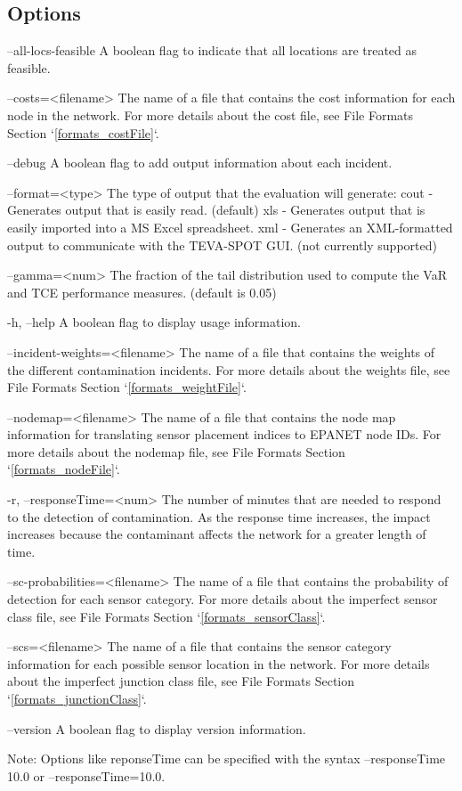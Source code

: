 \subsection{Options}\label{evalsensorExecutable_evalsensorOptions}
%
\begin{unknownListing}
     --all-locs-feasible
     A boolean flag to indicate that all locations are treated as feasible.
     
     --costs=<filename>
     The name of a file that contains the cost information for each node in the network.
	 For more details about the cost file, see File Formats Section `\ref{formats_costFile}`.
     
     --debug    
     A boolean flag to add output information about each incident.

     --format=<type>
     The type of output that the evaluation will generate:
		cout - 	Generates output that is easily read. (default)
		xls - 	Generates output that is easily imported into a MS Excel spreadsheet.
		xml - 	Generates an XML-formatted output to communicate 
				with the TEVA-SPOT GUI. (not currently supported)
		      
     --gamma=<num>
     The fraction of the tail distribution used to compute the VaR and TCE 
	 performance measures. (default is 0.05)
	 
	 -h, --help
	 A boolean flag to display usage information.
	 
	 --incident-weights=<filename>
	 The name of a file that contains the weights of the different contamination incidents. 
	 For more details about the weights file, see File Formats Section `\ref{formats_weightFile}`.
	 
	 --nodemap=<filename>
	 The name of a file that contains the node map information for translating sensor placement 
	 indices to EPANET node IDs. For more details about the nodemap file, see File Formats 
	 Section `\ref{formats_nodeFile}`.
	 
	 -r, --responseTime=<num>
	 The number of minutes that are needed to respond to the detection of 
	 contamination. As the response time increases, the impact increases 
	 because the contaminant affects the network for a greater length of 
	 time.
	 
	 --sc-probabilities=<filename>
	 The name of a file that contains the probability of detection for each sensor category. 
	 For more details about the imperfect sensor class file, see File Formats Section 
	 `\ref{formats_sensorClass}`.
	 
	 --scs=<filename>
	 The name of a file that contains the sensor category information for each possible 
	 sensor location in the network. For more details about the imperfect junction class file, 
	 see File Formats Section `\ref{formats_junctionClass}`.
	 
	 --version
	 A boolean flag to display version information.
	 
	 Note: Options like reponseTime can be specified with the syntax
	 --responseTime 10.0 or --responseTime=10.0.
\end{unknownListing}

